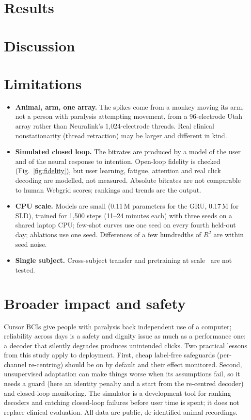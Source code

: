\documentclass[10pt,twocolumn]{article}
\begin{document}
\section{Results}


\section{Discussion}


\section{Limitations}
\begin{itemize}
\item \textbf{Animal, arm, one array.} The spikes come from a monkey moving its arm, not a person
with paralysis attempting movement, from a 96-electrode Utah array rather than Neuralink's
1{,}024-electrode threads. Real clinical nonstationarity (thread retraction) may be larger and
different in kind.
\item \textbf{Simulated closed loop.} The bitrates are produced by a model of the user and of the
neural response to intention. Open-loop fidelity is checked (Fig.~\ref{fig:fidelity}), but user
learning, fatigue, attention and real click decoding are modelled, not measured. Absolute
bitrates are not comparable to human Webgrid scores; rankings and trends are the output.
\item \textbf{CPU scale.} Models are small (0.11\,M parameters for the GRU, 0.17\,M for SLD), trained for 1{,}500 steps (11--24 minutes each)
with three seeds on a shared laptop CPU; few-shot curves use one seed on every fourth held-out
day; ablations use one seed. Differences of a few hundredths of $R^2$ are within seed noise.
\item \textbf{Single subject.} Cross-subject transfer and pretraining at scale~\cite{ye2025ndt3,azabou2023poyo}
are not tested.
\end{itemize}

\section{Broader impact and safety}
Cursor BCIs give people with paralysis back independent use of a computer; reliability across
days is a safety and dignity issue as much as a performance one: a decoder that silently
degrades produces unintended clicks. Two practical lessons from this study apply to deployment.
First, cheap label-free safeguards (per-channel re-centring) should be on by default and their
effect monitored. Second, unsupervised adaptation can make things worse when its assumptions
fail, so it needs a guard (here an identity penalty and a start from the re-centred decoder) and
closed-loop monitoring. The simulator is a development tool for ranking decoders and catching
closed-loop failures before user time is spent; it does not replace clinical evaluation. All
data are public, de-identified animal recordings.
\end{document}
